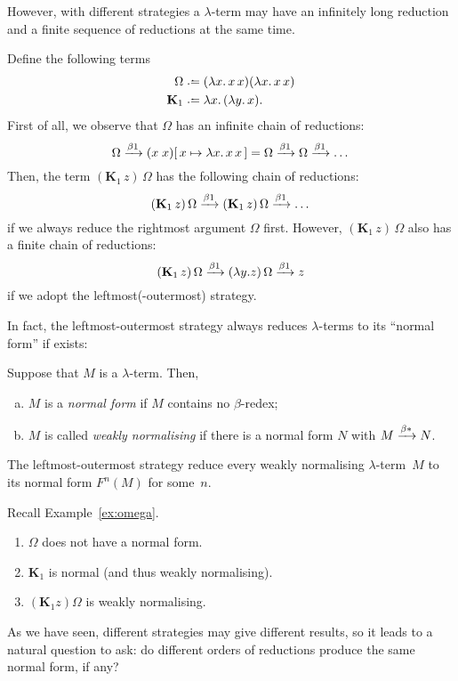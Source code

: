 However, with different strategies a $\lambda$-term may have an infinitely long
reduction and a finite sequence of reductions at the same time. 
\begin{example} \label{ex:omega}
  Define the following terms
  \begin{align*}
    \Omega &\defeq (\lambda x.\, x\,x)(\lambda x.\,x\,x) \\
    \mathbf{K}_1 & \defeq \lambda x.\,(\lambda y.\, x).
  \end{align*}
  First of all, we observe that $\Omega$ has an infinite chain of reductions:
  \[
    \Omega \xrightarrow{\beta1} (x\;x)[\,x\mapsto\lambda x.\, x\,x\,] = \Omega 
    \xrightarrow{\beta1}\Omega \xrightarrow{\beta1} \dots 
  \]
  Then, the term $(\mathbf{K}_1\,z)\,\Omega$ has the following
  chain of reductions:
  \[
    (\mathbf{K}_1\,z)\,\Omega
    \xrightarrow{\beta1} 
    (\mathbf{K}_1\,z)\,\Omega
    \xrightarrow{\beta1} \dots
  \]
  if we always reduce the rightmost argument $\Omega$ first.
  However, $(\mathbf{K}_1\,z)\,\Omega$ also has a finite chain of reductions:
  \[
    (\mathbf{K}_1\,z)\,\Omega
    \xrightarrow{\beta1} (\lambda y. z)\,\Omega
    \xrightarrow{\beta1} z
  \]
  if we adopt the leftmost(-outermost) strategy.
\end{example}
In fact, the leftmost-outermost strategy always reduces $\lambda$-terms to its
``normal form'' if exists:
\begin{definition}
  Suppose that $M$ is a $\lambda$-term. Then, 
  \begin{enumerate}[(a)]
    \item $M$ is a \emph{normal form} if $M$ contains no $\beta$-redex;
    \item $M$ is called \emph{weakly normalising} if there is a normal form
      $N$ with $M \xrightarrow{\beta*} N$.
  \end{enumerate}
\end{definition}
\begin{theorem}
  The leftmost-outermost strategy reduce every weakly
  normalising $\lambda$-term~$M$ to its normal form $F^n(M)$ for some~$n$.
\end{theorem}

\begin{example}
  Recall Example~\ref{ex:omega}. 
  \begin{enumerate}
    \item $\Omega$ does not have a normal form.
    \item $\mathbf{K}_1$ is normal (and thus weakly normalising).
    \item $(\mathbf{K}_1 z) \Omega$ is weakly normalising.
  \end{enumerate}
\end{example}
As we have seen, different strategies may give different results, so it leads to
a natural question to ask: do different orders of reductions produce the same
normal form, if any? 


